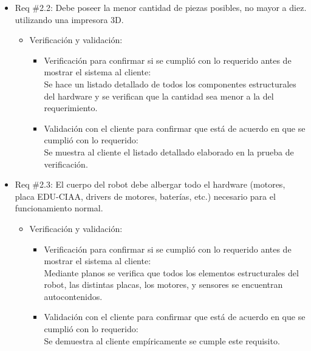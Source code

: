 \documentclass[11pt]{charter}
\begin{document}
\begin{itemize}
\item Req \#2.2: Debe poseer la menor cantidad de piezas posibles, no mayor a diez. utilizando una impresora 3D.
\begin{itemize}
\item Verificación y validación:
	\begin{itemize}
	\item Verificación para confirmar si se cumplió con lo requerido 	antes de mostrar el sistema al cliente:\\
	Se hace un listado detallado de todos los componentes
	estructurales del hardware y se verifican que la cantidad sea 
	menor a la del requerimiento.
	\item Validación con el cliente para confirmar que está de 				acuerdo en que se cumplió con lo requerido:\\
	Se muestra al cliente el listado detallado elaborado en la
	 prueba de verificación. 
	\end{itemize}
\end{itemize}
\end{itemize}

\begin{itemize}
\item Req \#2.3: El cuerpo del robot debe albergar todo el hardware (motores, placa EDU-CIAA, drivers de motores, baterías, etc.) necesario para el funcionamiento normal.
\begin{itemize}
\item Verificación y validación:
	\begin{itemize}
	\item Verificación para confirmar si se cumplió con lo requerido 	antes de mostrar el sistema al cliente:\\
	Mediante planos se verifica que todos los elementos
	estructurales del robot, las distintas placas, los motores, y
	sensores se encuentran autocontenidos.  
	\item Validación con el cliente para confirmar que está de 				acuerdo en que se cumplió con lo requerido:\\
	Se demuestra al cliente empíricamente se cumple este requisito.
	\end{itemize}
\end{itemize}
\end{itemize}
\end{document}
